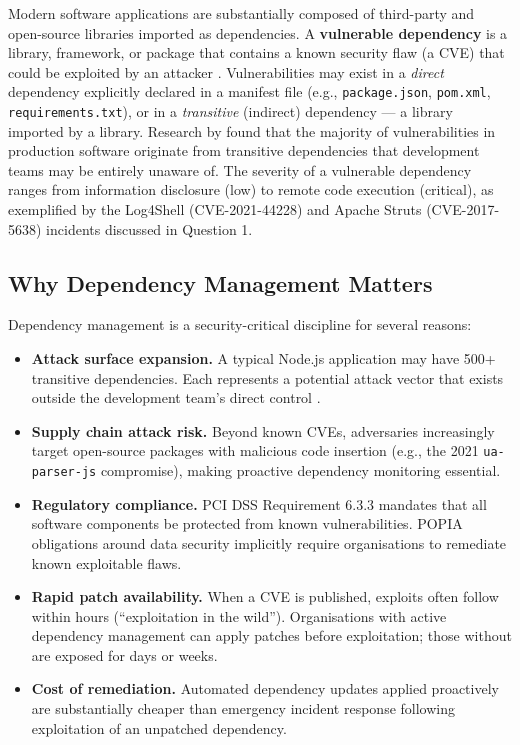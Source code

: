 \documentclass[12pt,a4paper]{article}
\begin{document}
Modern software applications are substantially composed of third-party and open-source
libraries imported as dependencies. A \textbf{vulnerable dependency} is a library,
framework, or package that contains a known security flaw (a CVE) that could be exploited
by an attacker \citep{owaspDC}. Vulnerabilities may exist in a \textit{direct} dependency
explicitly declared in a manifest file (e.g., \texttt{package.json}, \texttt{pom.xml},
\texttt{requirements.txt}), or in a \textit{transitive} (indirect) dependency --- a
library imported by a library. Research by \citet{snyk2023} found that the majority of
vulnerabilities in production software originate from transitive dependencies that
development teams may be entirely unaware of. The severity of a vulnerable dependency
ranges from information disclosure (low) to remote code execution (critical), as
exemplified by the Log4Shell (CVE-2021-44228) and Apache Struts (CVE-2017-5638) incidents
discussed in Question 1.

\subsection{Why Dependency Management Matters}

Dependency management is a security-critical discipline for several reasons:

\begin{itemize}
  \item \textbf{Attack surface expansion.} A typical Node.js application may have 500+
    transitive dependencies. Each represents a potential attack vector that exists
    outside the development team's direct control \citep{snyk2023}.

  \item \textbf{Supply chain attack risk.} Beyond known CVEs, adversaries increasingly
    target open-source packages with malicious code insertion (e.g., the 2021
    \texttt{ua-parser-js} compromise), making proactive dependency monitoring essential.

  \item \textbf{Regulatory compliance.} PCI DSS Requirement 6.3.3 mandates that all
    software components be protected from known vulnerabilities. POPIA obligations around
    data security implicitly require organisations to remediate known exploitable flaws.

  \item \textbf{Rapid patch availability.} When a CVE is published, exploits often follow
    within hours (``exploitation in the wild''). Organisations with active dependency
    management can apply patches before exploitation; those without are exposed for days
    or weeks.

  \item \textbf{Cost of remediation.} Automated dependency updates applied proactively
    are substantially cheaper than emergency incident response following exploitation of
    an unpatched dependency.
\end{itemize}
\end{document}
